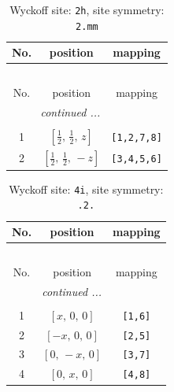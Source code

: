 \documentclass[fleqn,8pt]{jsarticle}
\begin{document}
\begin{longtable}{ccc}
\caption{Wyckoff site: {\tt 2h}, site symmetry: {\tt 2.mm}}
 \\
 \hline \hline
No. & position & mapping \\ \hline \endfirsthead

\multicolumn{2}{l}{\tablename\ \thetable{}} \\
 \hline \hline
No. & position & mapping \\ \hline \endhead

 \hline \hline
\multicolumn{2}{r}{\footnotesize\it continued ...} \\ \endfoot

 \hline \hline
\multicolumn{2}{r}{} \\ \endlastfoot

1 & $\left[ \frac{1}{2},\, \frac{1}{2},\, z \right]$ & {\tt [1,2,7,8]} \\ \hline
2 & $\left[ \frac{1}{2},\, \frac{1}{2},\, - z \right]$ & {\tt [3,4,5,6]} \\
\end{longtable}
\renewcommand{\arraystretch}{1.2}
\begin{longtable}{ccc}
\caption{Wyckoff site: {\tt 4i}, site symmetry: {\tt .2.}}
 \\
 \hline \hline
No. & position & mapping \\ \hline \endfirsthead

\multicolumn{2}{l}{\tablename\ \thetable{}} \\
 \hline \hline
No. & position & mapping \\ \hline \endhead

 \hline \hline
\multicolumn{2}{r}{\footnotesize\it continued ...} \\ \endfoot

 \hline \hline
\multicolumn{2}{r}{} \\ \endlastfoot

1 & $\left[ x,\, 0,\, 0 \right]$ & {\tt [1,6]} \\ \hline
2 & $\left[ - x,\, 0,\, 0 \right]$ & {\tt [2,5]} \\ \hline
3 & $\left[ 0,\, - x,\, 0 \right]$ & {\tt [3,7]} \\ \hline
4 & $\left[ 0,\, x,\, 0 \right]$ & {\tt [4,8]} \\
\end{longtable}
\renewcommand{\arraystretch}{1.2}
\end{document}
